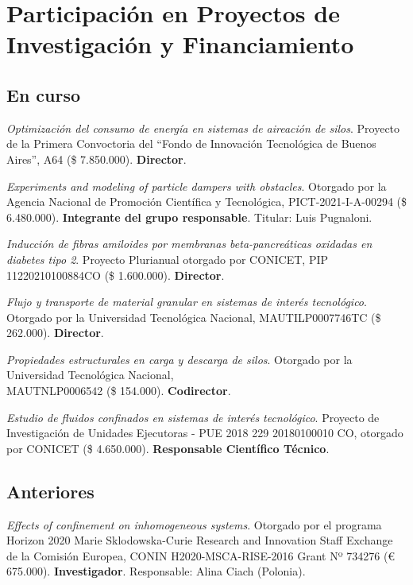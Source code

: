 \section{Participación en Proyectos de Investigación y Financiamiento}
\subsection{En curso}

 \textit{Optimización del consumo de energía en sistemas de aireación de silos}. Proyecto de la Primera Convoctoria del ``Fondo de Innovación Tecnológica de Buenos Aires'', A64 (\$ 7.850.000). \textbf{Director}.

 \textit{Experiments and modeling of particle dampers with obstacles}. Otorgado por la Agencia Nacional de Promoción Científica y Tecnológica, PICT-2021-I-A-00294 (\$ 6.480.000). \textbf{Integrante del grupo responsable}. Titular: Luis Pugnaloni.

 \textit{Inducción de fibras amiloides por membranas beta-pancreáticas oxidadas en diabetes tipo 2}. Proyecto Plurianual otorgado por CONICET, PIP 11220210100884CO (\$ 1.600.000). \textbf{Director}.

 \textit{Flujo y transporte de material granular en sistemas de interés tecnológico}. Otorgado por la Universidad Tecnológica Nacional, MAUTILP0007746TC (\$ 262.000). \textbf{Director}.

 \textit{Propiedades estructurales en carga y descarga de silos}. Otorgado por la Universidad Tecnológica Nacional,\\ MAUTNLP0006542 (\$ 154.000). \textbf{Codirector}.

 \textit{Estudio de fluidos confinados en sistemas de interés tecnológico}. Proyecto de Investigación de Unidades Ejecutoras - PUE 2018 229 20180100010 CO, otorgado por CONICET (\$ 4.650.000). \textbf{Responsable Científico Técnico}.


\subsection{Anteriores}

 \textit{Effects of confinement on inhomogeneous systems}. Otorgado por el programa Horizon 2020 Marie Sklodowska-Curie Research and Innovation Staff Exchange de la Comisión Europea, CONIN H2020-MSCA-RISE-2016 Grant Nº 734276 (€ 675.000). \textbf{Investigador}. Responsable: Alina Ciach (Polonia).

